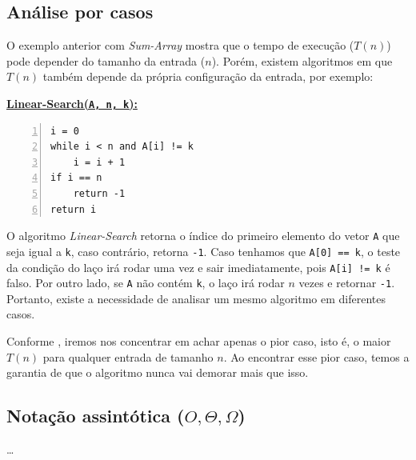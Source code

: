 \documentclass[12pt,a4paper]{article}
\newcommand{\listtitle}[1]{%
    \par\medskip\noindent
    {\small\textbf{\underline{#1:}}}
    \par\nopagebreak
}
\begin{document}
\subsection{Análise por casos}
O exemplo anterior com \textit{Sum-Array} mostra que o tempo de execução ($T(n)$) pode depender do tamanho da entrada ($n$).
Porém, existem algoritmos em que $T(n)$ também depende da própria configuração da entrada, por exemplo:
\listtitle{Linear-Search(\texttt{A, n, k})}
\begin{Verbatim}[numbers=left, commandchars=\\\{\}]
i = 0
while i < n and A[i] != k
    i = i + 1
if i == n
    return -1
return i
\end{Verbatim}
O algoritmo \textit{Linear-Search} retorna o índice do primeiro elemento do vetor \texttt{A} que seja igual a \texttt{k}, caso contrário, retorna \texttt{-1}.
Caso tenhamos que \texttt{A[0] == k}, o teste da condição do laço irá rodar uma vez e sair imediatamente, pois \texttt{A[i] != k} é falso.
Por outro lado, se \texttt{A} não contém \texttt{k}, o laço irá rodar $n$ vezes e retornar \texttt{-1}.
Portanto, existe a necessidade de analisar um mesmo algoritmo em diferentes casos.

Conforme \textcite[31]{clrs2022}, iremos nos concentrar em achar apenas o pior caso, isto é,
o maior $T(n)$ para qualquer entrada de tamanho $n$.
Ao encontrar esse pior caso, temos a garantia de que o algoritmo nunca vai demorar mais que isso.

\subsection{Notação assintótica (\texorpdfstring{$O, \Theta, \Omega$}{O, Theta, Omega})}
\dots

\pagebreak
\end{document}
